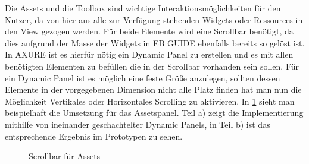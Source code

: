 Die Assets und die Toolbox sind wichtige Interaktionsmöglichkeiten für den Nutzer, da von hier aus alle zur Verfügung stehenden Widgets oder Ressources in den View gezogen werden.
Für beide Elemente wird eine Scrollbar benötigt, da dies aufgrund der Masse der Widgets in EB GUIDE ebenfalls bereits so gelöst ist.
In AXURE ist es hierfür nötig ein Dynamic Panel zu erstellen und es mit allen benötigten Elementen zu befüllen die in der Scrollbar vorhanden sein sollen.
Für ein Dynamic Panel ist es möglich eine feste Größe anzulegen, sollten dessen Elemente in der vorgegebenen Dimension nicht alle Platz finden hat man nun die Möglichkeit Vertikales oder Horizontales Scrolling zu aktivieren.
In \cref{fig:Prototyp_02} sieht man beispielhaft die Umsetzung für das Assetspanel.
Teil a) zeigt die Implementierung mithilfe von ineinander geschachtelter Dynamic Panels, in Teil b) ist das entsprechende Ergebnis im Prototypen zu sehen.

\begin{figure}%
\centering
{}%
\qquad
{}%

\caption{Scrollbar für Assets}%
\label{fig:Prototyp_02}
\end{figure}

